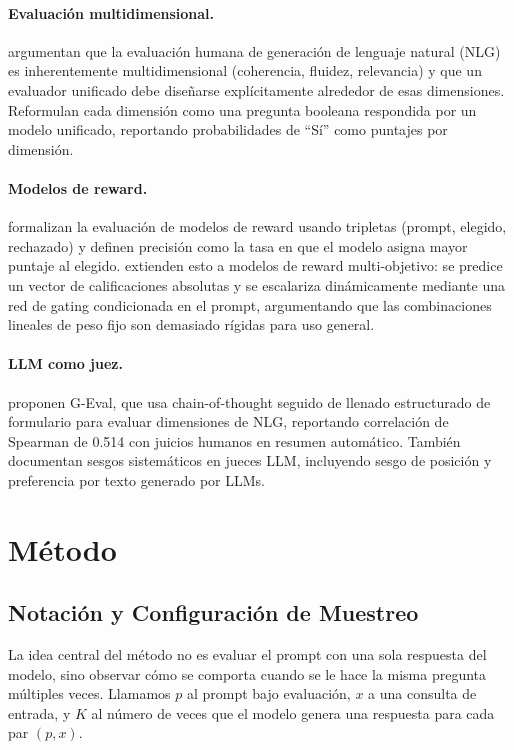 \documentclass[11pt,a4paper]{article}
\begin{document}
\paragraph{Evaluación multidimensional.}
\citet{unieval2022} argumentan que la evaluación humana de generación de lenguaje natural (NLG) es inherentemente multidimensional (coherencia, fluidez, relevancia) y que un evaluador unificado debe diseñarse explícitamente alrededor de esas dimensiones. Reformulan cada dimensión como una pregunta booleana respondida por un modelo unificado, reportando probabilidades de ``Sí'' como puntajes por dimensión.

\paragraph{Modelos de reward.}
\citet{rewardbench2024} formalizan la evaluación de modelos de reward usando tripletas (prompt, elegido, rechazado) y definen precisión como la tasa en que el modelo asigna mayor puntaje al elegido. \citet{armorm2024} extienden esto a modelos de reward multi-objetivo: se predice un vector de calificaciones absolutas y se escalariza dinámicamente mediante una red de gating condicionada en el prompt, argumentando que las combinaciones lineales de peso fijo son demasiado rígidas para uso general.

\paragraph{LLM como juez.}
\citet{geval2023} proponen G-Eval, que usa chain-of-thought seguido de llenado estructurado de formulario para evaluar dimensiones de NLG, reportando correlación de Spearman de 0.514 con juicios humanos en resumen automático. También documentan sesgos sistemáticos en jueces LLM, incluyendo sesgo de posición y preferencia por texto generado por LLMs.

\section{Método}

\subsection{Notación y Configuración de Muestreo}

La idea central del método no es evaluar el prompt con una sola respuesta del modelo, sino observar cómo se comporta cuando se le hace la misma pregunta múltiples veces. Llamamos $p$ al prompt bajo evaluación, $x$ a una consulta de entrada, y $K$ al número de veces que el modelo genera una respuesta para cada par $(p, x)$.
\end{document}
